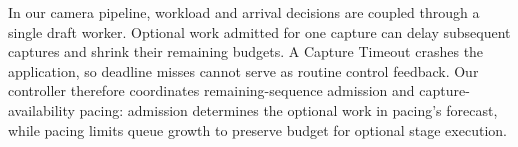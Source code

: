 In our camera pipeline, workload and arrival decisions are coupled through a single draft worker.
Optional work admitted for one capture can delay subsequent captures and shrink their remaining budgets.
A Capture Timeout crashes the application, so deadline misses cannot serve as routine control feedback.
Our controller therefore coordinates remaining-sequence admission and capture-availability pacing: admission determines the optional work in pacing's forecast, while pacing limits queue growth to preserve budget for optional stage execution.
